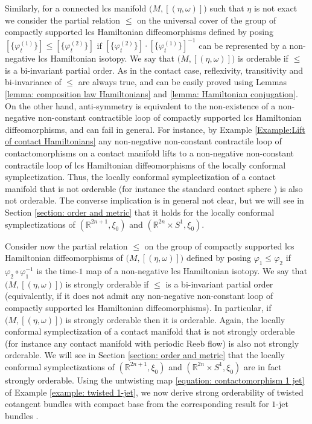 \documentclass{amsart}
\theoremstyle{remark}
\begin{document}
Similarly,
for a connected lcs manifold $\big( M, [(\eta, \omega)] \big)$
such that $\eta$ is not exact
we consider the partial relation $\leq$
on the universal cover of the group
of compactly supported lcs Hamiltonian diffeomorphisms
defined by posing $[\{\varphi_t^{(1)}\}] \leq [\{\varphi_t^{(2)}\}]$
if $[\{\varphi_t^{(2)}\}] \cdot [\{\varphi_t^{(1)}\}]^{-1}$
can be represented by a non-negative lcs Hamiltonian isotopy.
We say that $\big( M, [(\eta, \omega)] \big)$ is orderable
if $\leq$ is a bi-invariant partial order.
As in the contact case,
reflexivity, transitivity and bi-invariance of $\leq$
are always true,
and can be easily proved
using Lemmas \ref{lemma: composition law Hamiltonians}
and \ref{lemma: Hamiltonian conjugation}.
On the other hand,
anti-symmetry is equivalent to the non-existence
of a non-negative non-constant contractible loop
of compactly supported lcs Hamiltonian diffeomorphisms,
and can fail in general.
For instance,
by Example \ref{Example:Lift of contact Hamiltonians}
any non-negative non-constant contractile loop of contactomorphisms
on a contact manifold lifts to a non-negative non-constant contractile loop
of lcs Hamiltonian diffeomorphisms of the locally conformal symplectization.
Thus,
the locally conformal symplectization
of a contact manifold that is not orderable
(for instance the standard contact sphere \cite{EKP})
is also not orderable.
The converse implication is in general not clear,
but we will see in Section \ref{section: order and metric}
that it holds for the locally conformal symplectizations
of $(\mathbb{R}^{2n+1}, \xi_0)$ and $(\mathbb{R}^{2n} \times S^1, \xi_0)$.

Consider now the partial relation $\leq$
on the group of compactly supported
lcs Hamiltonian diffeomorphisms of $\big( M, [(\eta, \omega)] \big)$
defined by posing $\varphi_1 \leq \varphi_2$
if $\varphi_2 \circ \varphi_1^{-1}$
is the time-$1$ map of a non-negative lcs Hamiltonian isotopy.
We say that $\big( M, [(\eta, \omega)] \big)$ is strongly orderable
if $\leq$ is a bi-invariant partial order
(equivalently,
if it does not admit
any non-negative non-constant loop
of compactly supported lcs Hamiltonian diffeomorphisms).
In particular,
if $\big( M, [(\eta, \omega)] \big)$ is strongly orderable
then it is orderable.
Again,
the locally conformal symplectization of a contact manifold
that is not strongly orderable
(for instance any contact manifold
with periodic Reeb flow)
is also not strongly orderable.
We will see in Section \ref{section: order and metric}
that the locally conformal symplectizations
of $(\mathbb{R}^{2n+1}, \xi_0)$ and $(\mathbb{R}^{2n} \times S^1, \xi_0)$
are in fact strongly orderable.
Using the untwisting map \eqref{equation: contactomorphism 1 jet}
of Example \ref{example: twisted 1-jet},
we now derive strong orderability
of twisted cotangent bundles with compact base
from the corresponding result for $1$-jet bundles
\cite{CFP, CN}. 
\end{document}
